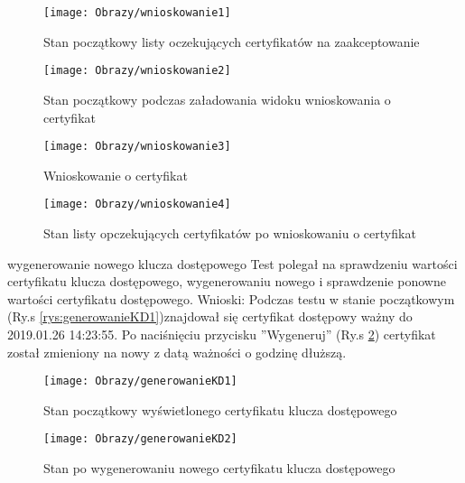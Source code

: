 \begin{enumerate*}
	
	\begin{figure}[ht!]

		\begin{minipage}{0.2\textwidth}
			\texttt{[image: Obrazy/wnioskowanie1]}
			\caption{Stan początkowy listy oczekujących certyfikatów na zaakceptowanie }
			\label{rys:wnioskowanie1}
		\end{minipage}
		\begin{minipage}{0.2\textwidth}
			\texttt{[image: Obrazy/wnioskowanie2]}
			\caption{Stan początkowy podczas załadowania widoku wnioskowania o certyfikat}
			\label{rys:wnioskowanie2}
		\end{minipage}
	
		\begin{minipage}{0.2\textwidth}
		\texttt{[image: Obrazy/wnioskowanie3]}
		\caption{Wnioskowanie o certyfikat}
		\label{rys:wnioskowanie3}
	\end{minipage}
	\begin{minipage}{0.2\textwidth}
		\texttt{[image: Obrazy/wnioskowanie4]}
		\caption{Stan listy opczekujących certyfikatów po wnioskowaniu o certyfikat}
		\label{rys:wnioskowanie4}
	\end{minipage}
	\end{figure}
	
	
	
	
	\item wygenerowanie nowego klucza dostępowego\newline
	Test polegał na sprawdzeniu wartości certyfikatu klucza dostępowego, wygenerowaniu nowego i sprawdzenie ponowne wartości certyfikatu dostępowego.
	Wnioski: Podczas testu w stanie początkowym (Ry.s \ref{rys:generowanieKD1})znajdował się certyfikat dostępowy ważny do 2019.01.26 14:23:55. Po naciśnięciu przycisku ''Wygeneruj''  (Ry.s \ref{rys:generowanieKD2}) certyfikat został zmieniony na nowy z datą ważności o godzinę dłuższą.
 
	
	\begin{figure}[ht!]
		
		\begin{minipage}{0.4\textwidth}
			\texttt{[image: Obrazy/generowanieKD1]}
			\caption{Stan początkowy wyświetlonego certyfikatu klucza dostępowego }
			\label{rys:generowanieKD1}
		\end{minipage}
		\begin{minipage}{0.4\textwidth}
			\texttt{[image: Obrazy/generowanieKD2]}
			\caption{Stan po wygenerowaniu nowego certyfikatu klucza dostępowego}
			\label{rys:generowanieKD2}
		\end{minipage}
		

\end{figure}
\end{enumerate*}
